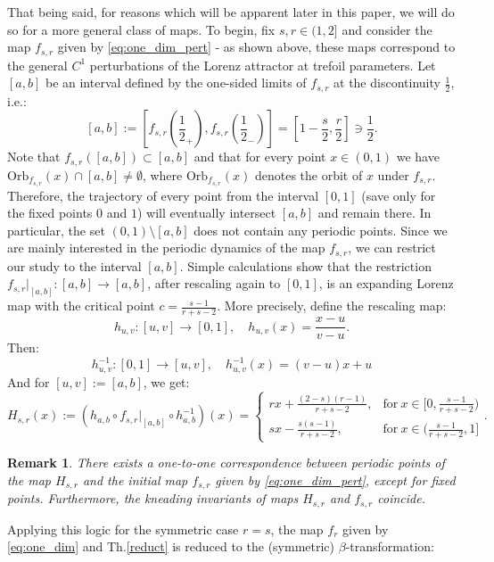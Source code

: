 \documentclass[10pt,reqno]{amsart}
\theoremstyle{plain}
\theoremstyle{assumption}
\theoremstyle{notation}
\theoremstyle{claim}
\theoremstyle{conj}
\newtheorem{remark}{\textbf{Remark}}[section]
\theoremstyle{theorem}
\theoremstyle{proposition}
\theoremstyle{corollary}
\begin{document}
That being said, for reasons which will be apparent later in this paper, we will do so for a more general class of maps. To begin, fix $s,r\in(1,2]$ and consider the map $f_{s,r}$ given by \eqref{eq:one_dim_pert} - as shown above, these maps correspond to the general $C^1$ perturbations of the Lorenz attractor at trefoil parameters. Let $[a,b]$ be an interval defined by the one-sided limits of $f_{s,r}$ at the discontinuity $\frac{1}{2}$, i.e.:
$$
[a,b]:=\left[f_{s,r}\left(\frac{1}{2}_+\right),f_{s,r}\left(\frac{1}{2}_-\right)\right]=\left[1-\frac{s}{2},\frac{r}{2}\right]\ni\frac{1}{2}.
$$
Note that $f_{s,r}([a,b])\subset[a,b]$ and that for every point $x\in(0,1)$ we have $\text{Orb}_{f_{s,r}}(x)\cap[a,b]\neq\emptyset$, where $\text{Orb}_{f_{s,r}}(x)$ denotes the orbit of $x$ under $f_{s,r}$. Therefore, the trajectory of every point from the interval $[0,1]$ (save only for the fixed points $0$ and $1$) will eventually intersect $[a,b]$ and remain there. In particular, the set $(0,1)\setminus[a,b]$ does not contain any periodic points. Since we are mainly interested in the periodic dynamics of the map $f_{s,r}$, we can restrict our study to the interval $[a,b]$. Simple calculations show that the restriction $f_{s,r}|_{[a,b]}\colon[a,b]\to[a,b]$, after rescaling again to $[0,1]$, is an expanding Lorenz map with the critical point $c=\frac{s-1}{r+s-2}$. More precisely, define the rescaling map:
\begin{equation}
\label{eq:rescaling}
h_{u,v}\colon[u,v]\to[0,1],\quad h_{u,v}(x)=\frac{x-u}{v-u}.
\end{equation}
Then:
$$
h_{u,v}^{-1}\colon[0,1]\to[u,v],\quad h_{u,v}^{-1}(x)=(v-u)x+u
$$ 
And for $[u,v]:=[a,b]$, we get:
\begin{equation}
H_{s,r}(x):=\left(h_{a,b}\circ f_{s,r}|_{[a,b]}\circ h_{a,b}^{-1}\right)(x)=
\begin{cases}
			rx+\frac{(2-s)(r-1)}{r+s-2}, & \text{for}\ x\in[0,\frac{s-1}{r+s-2})\\
            sx-\frac{s(s-1)}{r+s-2}, & \text{for}\ x\in(\frac{s-1}{r+s-2},1]
		 \end{cases}.
\end{equation}
\begin{remark}\label{rem:one-to-one}
There exists a one-to-one correspondence between periodic points of the map $H_{s,r}$ and the initial map $f_{s,r}$ given by \eqref{eq:one_dim_pert}, except for fixed points. Furthermore, the kneading invariants of maps $H_{s,r}$ and $f_{s,r}$ coincide.
\end{remark}
Applying this logic for the symmetric case $r=s$, the map $f_r$ given by \eqref{eq:one_dim} and Th.\ref{reduct} is reduced to the (symmetric) $\beta$-transformation: 
\end{document}
